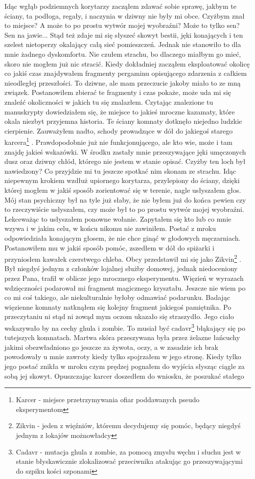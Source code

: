 \documentclass[12pt,a4paper]{report}
\begin{document}
Idąc wgłąb podziemnych korytarzy zacząłem zdawać sobie sprawę, jakbym te ściany, ta podłoga, regały, i naczynia w dziwny nie były mi obce. Czyżbym znał to miejsce? A może to po prostu wytwór mojej wyobraźni? Może to tylko sen? Sen na jawie... Stąd też zdaje mi się słyszeć skowyt bestii, jęki konających i ten szelest nietoperzy okalający całą sieć pomieszczeń. Jednak nie stanowiło to dla mnie żadnego dyskomfortu. Nie czułem strachu, bo dlaczego miałbym go mieć, skoro nie mogłem już nic stracić. Kiedy dokładniej zacząłem eksploatować okolicę co jakiś czas znajdywałem fragmenty pergaminu opisującego zdarzenia z całkiem nieodległej przeszłości. To dziwne, ale mam przeczucie jakoby miało to ze mną związek. Postanowiłem zbierać te fragmenty i czas pokaże, może uda mi się znaleźć okoliczności w jakich tu się znalazłem. Czytając znalezione tu manuskrypty dowiedziałem się, że miejsce to jakieś mroczne kazamaty, które okala niezbyt przyjemna historia. Te ściany komnaty dotknęło niejedno ludzkie cierpienie. Zauważyłem nadto, schody prowadzące w dół do jakiegoś starego karcera\footnote{Karcer - miejsce przetrzymywania ofiar poddawanych pseudo eksperymentom} . Prawdopodobnie już nie funkcjonującego, ale kto wie, może i tam znajdę jakieś wskazówki. W środku zastały mnie przeszywające jęki umęczonych dusz oraz dziwny chłód, którego nie jestem w stanie opisać. Czyżby ten loch był nawiedzony? Co przyjdzie mi tu jeszcze spotkać nim skonam ze strachu. Idąc niepewnym krokiem wzdłuż upiornego korytarza, przylepiony do ściany, dzięki której mogłem w jakiś sposób zorientować się w terenie, nagle usłyszałem głos. Mój stan psychiczny był na tyle już słaby, że nie byłem już do końca pewien czy to rzeczywiście usłyszałem, czy może był to po prostu wytwór mojej wyobraźni. Lekceważąc to usłyszałem ponowne wołanie. Zapytałem się kto lub co mnie wzywa i w jakim celu, w końcu nikomu nie zawiniłem. Postać z mroku odpowiedziała konającym głosem, że nie chce ginąć w głodowych męczarniach. Postanowiłem mu w jakiś sposób pomóc, zszedłem w dół do spiżarki i przyniosłem kawałek czerstwego chleba. Obcy przedstawił mi się jako Zikvin\footnote{Zikvin - jeden z więźniów, któremu decydujemy się pomóc, będący niegdyś jednym z lokajów możnowładcy} . Był niegdyś jednym z członków lojalnej służby domowej, jednak niedoceniony przez Pana, trafił w oblicze jego mrocznego eksperymentu. Więzień w wyrazach wdzięczności podarował mi fragment magicznego kryształu. Jeszcze nie wiem po co mi coś takiego, ale niekulturalnie byłoby odmawiać podarunku. Badając więzienne komnaty natknąłem się kolejny fragment jakiegoś pamiętnika. Po przeczytaniu ni stąd ni zowąd mym oczom ukazało się straszydło. Jego ciało wskazywało by na cechy ghula i zombie. To musiał być cadavr\footnote{Cadavr - mutacja ghula z zombie, za pomocą zmysłu węchu i słuchu jest w stanie błyskawicznie zlokalizować przeciwnika atakując go przeszywającymi do szpiku kości szponami}  błąkający się po tutejszych komnatach. Martwa skóra przeszywana była przez żelazne łańcuchy jakimi obezwładniono go jeszcze za żywota, oczy, a w zasadzie ich brak powodowały u mnie zawroty kiedy tylko spojrzałem w jego stronę. Kiedy tylko jego postać znikła w mroku czym prędzej pognałem do wyjścia słysząc ciągle za sobą jej skowyt. Opuszczając karcer doszedłem do wniosku, że poszukać stałego 
\end{document}
